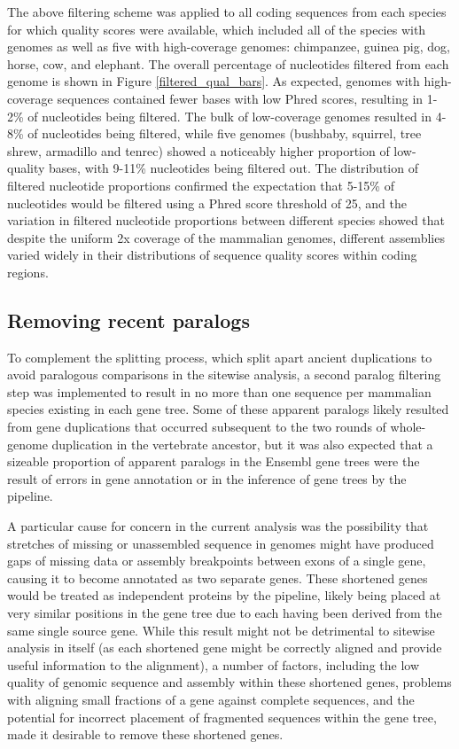 The above filtering scheme was applied to all coding sequences from
each species for which quality scores were available, which included
all of the species with \lcv genomes as well as five with
high-coverage genomes: chimpanzee, guinea pig, dog, horse, cow, and
elephant. The overall percentage of nucleotides filtered from each
genome is shown in Figure \ref{filtered_qual_bars}. As expected,
genomes with high-coverage sequences contained fewer bases with low
Phred scores, resulting in 1-2\% of nucleotides being filtered. The
bulk of low-coverage genomes resulted in 4-8\% of nucleotides being
filtered, while five genomes (bushbaby, squirrel, tree shrew,
armadillo and tenrec) showed a noticeably higher proportion of
low-quality bases, with 9-11\% nucleotides being filtered out. The
distribution of filtered nucleotide proportions confirmed the
expectation that 5-15\% of nucleotides would be filtered using a Phred
score threshold of 25, and the variation in filtered nucleotide
proportions between different species showed that despite the uniform
2x coverage of the \lcv mammalian genomes, different assemblies varied
widely in their distributions of sequence quality scores within coding
regions. 

\subsection{Removing recent paralogs}
\label{section_removing_paralogs}

To complement the \subtr{} splitting process, which split apart
ancient duplications to avoid paralogous comparisons in the sitewise
analysis, a second paralog filtering step was implemented to result in
no more than one sequence per mammalian species existing in each gene
tree. Some of these apparent paralogs likely resulted from gene
duplications that occurred subsequent to the two rounds of
whole-genome duplication in the vertebrate ancestor, but it was also
expected that a sizeable proportion of apparent paralogs in the
Ensembl gene trees were the result of errors in gene annotation or in
the inference of gene trees by the \cmp pipeline.

A particular cause for concern in the current analysis was the
possibility that stretches of missing or unassembled sequence in \lcv
genomes might have produced gaps of missing data or assembly
breakpoints between exons of a single gene, causing it to become
annotated as two separate genes. These shortened genes would be
treated as independent proteins by the \cmp pipeline, likely being
placed at very similar positions in the gene tree due to each having
been derived from the same single source gene. While this result might
not be detrimental to sitewise analysis in itself (as each shortened
gene might be correctly aligned and provide useful information to the
alignment), a number of factors, including the low quality of genomic
sequence and assembly within these shortened genes, problems with
aligning small fractions of a gene against complete sequences, and the
potential for incorrect placement of fragmented sequences within the
gene tree, made it desirable to remove these shortened genes.

